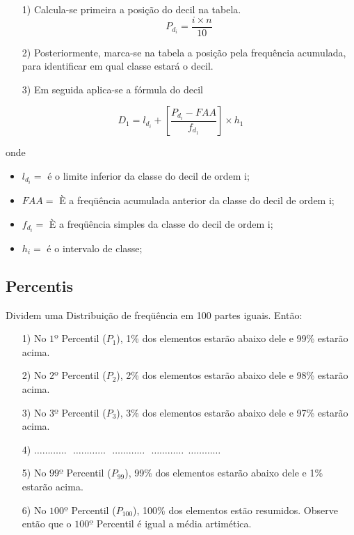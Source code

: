 \begin{enumerate}
\item [{1)}]Calcula-se primeira a posição do decil na tabela.
$$ P_{d_{i}}=\frac{i \times n}{10}$$
\item [{2)}] Posteriormente, marca-se na tabela a posição pela frequência acumulada, para identificar em qual classe estará o decil.
\item [{3)}] Em seguida aplica-se a fórmula do decil
\end{enumerate}

\begin{equation}\label{}
    D_{1}= l_{d_{i}}+\left[\frac{P_{d_{i}}-FAA}{f_{d_{1}}}\right]\times h_{1}
\end{equation}

 onde

 \begin{itemize}
   \item $l_{d_{i}}=$ é o limite inferior da classe do decil de ordem i;
   \item $FAA=$ È a freqüência acumulada anterior da classe do decil de ordem i;
   \item $f_{d_{i}}=$ È a freqüência simples da classe do decil de ordem i;
   \item $h_{i}=$ é o intervalo de classe;
 \end{itemize}



\subsection{Percentis}

Dividem uma Distribuição de freqüência em 100 partes iguais. Então:


\begin{enumerate}
  \item[{1)}] No $1º$ Percentil ($P_{1}$), 1\% dos elementos estarão abaixo dele e 99\% estarão acima.
  \item[{2)}] No $2º$ Percentil ($P_{2}$), 2\% dos elementos estarão abaixo dele e 98\% estarão acima.
  \item[{3)}] No $3º$ Percentil ($P_{3}$), 3\% dos elementos estarão abaixo dele e 97\% estarão acima.
   \item[{4)}] $\ldots \ldots \ldots \ldots \ \ \  \ldots \ldots \ldots \ldots \ \ \  \ldots \ldots \ldots \ldots \ \ \  \ldots \ldots \ldots \ldots \ \ \ldots \ldots \ldots \ldots$
  \item[{5)}] No $99º$ Percentil ($P_{99}$), 99\% dos elementos estarão abaixo dele e 1\% estarão acima.
   \item[{6)}] No $100º$ Percentil ($P_{100}$), 100\% dos elementos estão resumidos. Observe então que o $100º$ Percentil é igual a média artimética.
\end{enumerate}



